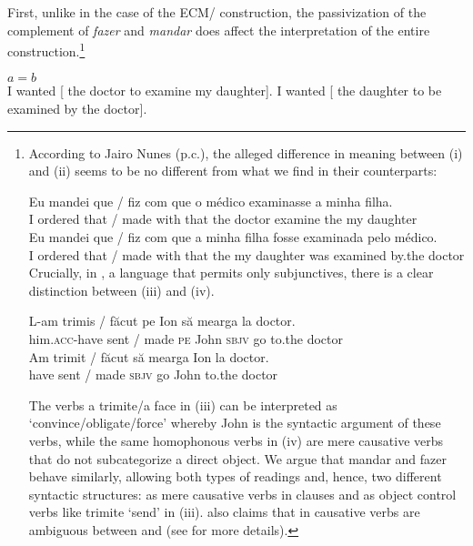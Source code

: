 \documentclass[output=paper]{langsci/langscibook}
\begin{document}
First, unlike in the case of the ECM\slash {} construction, the passivization of the complement of \textit{fazer} and \textit{mandar} does affect the interpretation of the entire construction.\footnote{According to Jairo Nunes (p.c.), the alleged difference in meaning between (i) and (ii) seems to be no different from what we find in their  counterparts: 

\ea \gll Eu mandei que / fiz      com que o    médico examinasse a    minha filha.\\
	I    ordered that / made with that         the doctor  examine      the my      daughter\\
\z
\ea
\gll Eu  mandei  que / fiz      com que a    minha filha        fosse examinada pelo     médico.\\
	I     ordered  that / made with that         the my     daughter  was   examined   by.the doctor\\
\z
Crucially, in , a language that permits only subjunctives, there is a clear distinction between (iii) and (iv). 

\ea \gll L-am              trimis / făcut     pe Ion   să     mearga la       doctor.\\
         him.\textsc{acc}-have sent / made      \textsc{pe} John \textsc{sbjv} go         to.the doctor\\
\z
\ea \gll Am trimit / făcut să     mearga Ion  la       doctor.\\
         have sent / made \textsc{sbjv} go        John to.the doctor\\
\z

The verbs a trimite\slash a face in (iii) can be interpreted as ‘convince\slash obligate\slash force’ whereby John is the syntactic  argument of these verbs, while the same homophonous verbs in (iv) are mere causative verbs that do not subcategorize a direct object. We argue that mandar and fazer behave similarly, allowing both types of readings and, hence, two different syntactic structures: as mere causative verbs in  clauses and as object control verbs like trimite ‘send’ in (iii). \citet{Wurmbrand2001} also claims that in  causative verbs are ambiguous between  and  (see \citet{Wurmbrand2001} for more details).}

\ea%
    $a = b$ \citep[119]{Farrell1995}\label{ex:moreno:9}\\
    \ea I wanted [ the doctor to examine my daughter].
    \ex I wanted [ the daughter to be examined by the doctor].
    \z
\z
\end{document}
